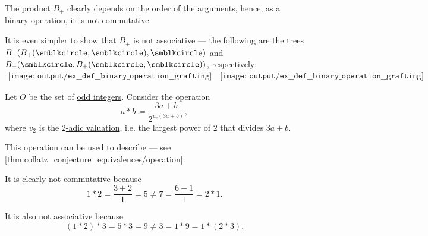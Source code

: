\begin{example}
\begin{thmenum}
    The product \( B_+ \) clearly depends on the order of the arguments, hence, as a binary operation, it is not commutative.

    It is even simpler to show that \( B_+ \) is not associative --- the following are the trees \( B_+(B_+(\anon, \anon), \anon) \) and \( B_+(\anon, B_+(\anon, \anon)) \), respectively:
    \begin{equation*}
      \begin{aligned}
        \texttt{[image: output/ex\_\_def\_\_binary\_operation\_\_grafting]}
        \quad
        \texttt{[image: output/ex\_\_def\_\_binary\_operation\_\_grafting]}
      \end{aligned}
    \end{equation*}

     Let \( O \) be the set of \hyperref[def:integer_parity]{odd integers}. Consider the operation
    \begin{equation}\label{eq:ex:def:binary_operation/collatz}
      a \ast b \coloneqq \frac {3a + b} {2^{v_2(3a + b)}},
    \end{equation}
    where \( v_2 \) is the \hyperref[def:padic_valuation]{\( 2 \)-adic valuation}, i.e. the largest power of \( 2 \) that divides \( 3a + b \).

    This operation can be used to describe  --- see \cref{thm:collatz_conjecture_equivalences/operation}.

    It is clearly not commutative because
    \begin{equation*}
      1 \ast 2 = \frac {3 + 2} 1 = 5 \neq 7 = \frac {6 + 1} 1= 2 \ast 1.
    \end{equation*}

    It is also not associative because
    \begin{equation*}
      (1 \ast 2) \ast 3 = 5 \ast 3 = 9 \neq 3 = 1 \ast 9 = 1 \ast (2 \ast 3).
    \end{equation*}
  \end{thmenum}
\end{example}

